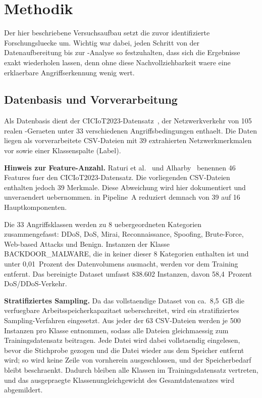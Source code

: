\section{Methodik}\label{methodik}

Der hier beschriebene Versuchsaufbau setzt die zuvor identifizierte Forschungsluecke um.
Wichtig war dabei, jeden Schritt von der Datenaufbereitung bis zur \shap{}-Analyse so
festzuhalten, dass sich die Ergebnisse exakt wiederholen lassen, denn ohne diese
Nachvollziehbarkeit waere eine erklaerbare Angriffserkennung wenig wert.

\subsection{Datenbasis und Vorverarbeitung}

Als Datenbasis dient der CICIoT2023-Datensatz~\cite{neto2023ciciot2023}, der Netzwerkverkehr
von 105 realen \iot{}-Geraeten unter 33 verschiedenen Angriffsbedingungen enthaelt.
Die Daten liegen als vorverarbeitete CSV-Dateien mit 39 extrahierten
Netzwerkmerkmalen vor sowie einer Klassenspalte (Label).

\textbf{Hinweis zur Feature-Anzahl.}
Raturi et al.\ \cite{raturi2026exploratory} und Alharby~\cite{alharby2025ciciot} benennen 46
Features fuer den CICIoT2023-Datensatz.
Die vorliegenden CSV-Dateien enthalten jedoch 39 Merkmale.
Diese Abweichung wird hier dokumentiert und unveraendert uebernommen.
\pca{} in Pipeline~A reduziert demnach von 39 auf 16 Hauptkomponenten.

Die 33 Angriffsklassen werden zu 8 uebergeordneten Kategorien zusammengefasst:
DDoS, DoS, Mirai, Reconnaissance, Spoofing, Brute-Force, Web-based Attacks und Benign.
Instanzen der Klasse BACKDOOR\_MALWARE, die in keiner dieser 8 Kategorien enthalten ist
und unter 0{,}01~Prozent des Datenvolumens ausmacht, werden vor dem Training entfernt.
Das bereinigte Dataset umfasst 838.602 Instanzen, davon 58{,}4~Prozent DoS/DDoS-Verkehr.

\textbf{Stratifiziertes Sampling.}
Da das vollstaendige Dataset von ca.\ 8{,}5~GB die verfuegbare Arbeitsspeicherkapazitaet
ueberschreitet, wird ein stratifiziertes Sampling-Verfahren eingesetzt.
Aus jeder der 63 CSV-Dateien werden je 500 Instanzen pro Klasse entnommen, sodass alle
Dateien gleichmaessig zum Trainingsdatensatz beitragen.
Jede Datei wird dabei vollstaendig eingelesen, bevor die Stichprobe gezogen und die Datei
wieder aus dem Speicher entfernt wird; so wird keine Zeile von vornherein ausgeschlossen, und
der Speicherbedarf bleibt beschraenkt.
Dadurch bleiben alle Klassen im Trainingsdatensatz vertreten, und das ausgepraegte
Klassenungleichgewicht des Gesamtdatensatzes wird abgemildert.

